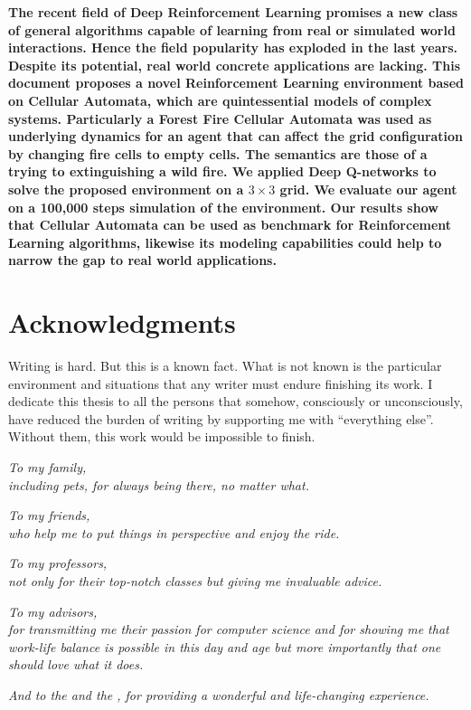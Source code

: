 \documentclass[
  12pt,
  openany]{book}
\begin{document}
\textbf{\large{The recent field of Deep Reinforcement Learning promises a new class of general algorithms capable of learning from real or simulated world interactions. Hence the field popularity has exploded in the last years. Despite its potential, real world concrete applications are lacking. This document proposes a novel Reinforcement Learning environment based on Cellular Automata, which are quintessential models of complex systems. Particularly a Forest Fire Cellular Automata was used as underlying dynamics for an agent that can affect the grid configuration by changing fire cells to empty cells. The semantics are those of a  trying to extinguishing a wild fire. We applied Deep Q-networks to solve the proposed environment on a $3 \times 3$ grid. We evaluate our agent on a 100,000 steps simulation of the environment. Our results show that Cellular Automata can be used as benchmark for Reinforcement Learning algorithms, likewise its modeling capabilities could help to narrow the gap to real world applications.}}

\hypertarget{acknowledgments}{%
\chapter*{Acknowledgments}\label{acknowledgments}}

Writing is hard. But this is a known fact. What is not known is the particular environment and situations that any writer must endure finishing its work. I dedicate this thesis to all the persons that somehow, consciously or unconsciously, have reduced the burden of writing by supporting me with ``everything else''. Without them, this work would be impossible to finish.

\begin{flushleft}
\emph{To my family,\\including pets, for always being there, no matter what.}

\emph{To my friends,\\who help me to put things in perspective and enjoy the ride.}

\emph{To my professors,\\not only for their top-notch classes but giving me invaluable advice.}

\emph{To my advisors,\\for transmitting me their passion for computer science and for
showing me that work-life balance is possible in this day and age but more importantly that one should love what it does.}

\emph{And to the  and the , for providing a wonderful and life-changing experience.}
\end{flushleft}
\end{document}
